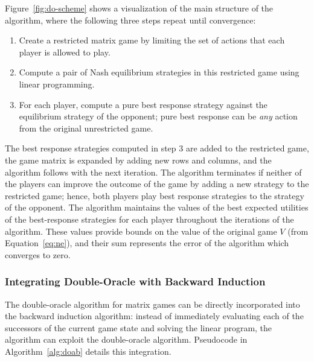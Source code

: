 Figure~\ref{fig:do-scheme} shows a visualization of the main structure of the algorithm, where the following three steps repeat until convergence:
\begin{enumerate}
\item Create a restricted matrix game by limiting the set of actions that each player is allowed to play.
\item Compute a pair of Nash equilibrium strategies in this restricted game using linear programming.
\item For each player, compute a pure best response strategy against the equilibrium strategy of the opponent; pure best response can be \emph{any} action from the original unrestricted game.
\end{enumerate}
The best response strategies computed in step 3 are added to the restricted game, the game matrix is expanded by adding new rows and columns, and the algorithm follows with the next iteration. The algorithm terminates if neither of the players can improve the outcome of the game by adding a new strategy to the restricted game; hence, both players play best response strategies to the strategy of the opponent. The algorithm maintains the values of the best expected utilities of the best-response strategies for each player throughout the iterations of the algorithm. These values provide bounds on the value of the original game $V$ (from Equation~\ref{eq:ne}), and their sum represents the error of the algorithm which converges to zero.


\subsubsection{Integrating Double-Oracle with Backward Induction}

The double-oracle algorithm for matrix games can be directly incorporated into the backward induction algorithm: instead of immediately evaluating each of the successors of the current game state and solving the linear program, the algorithm can exploit the double-oracle algorithm. Pseudocode in Algorithm~\ref{alg:doab} details this integration.

